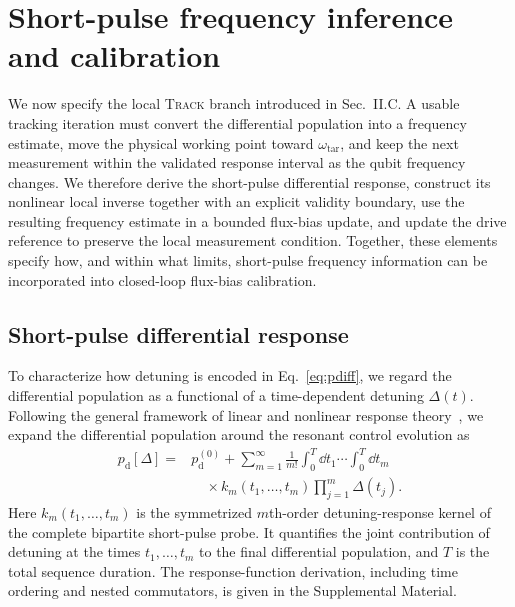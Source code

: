﻿\section{Short-pulse frequency inference and calibration}
\label{sec:inference-calibration}

We now specify the local \textsc{Track} branch introduced in Sec.~II.C.
A usable tracking iteration must convert the differential population into a
frequency estimate, move the physical working point toward
$\omega_{\mathrm{tar}}$, and keep the next measurement within the validated
response interval as the qubit frequency changes. We therefore derive the
short-pulse differential response, construct its nonlinear local inverse
together with an explicit validity boundary, use the resulting frequency
estimate in a bounded flux-bias update, and update the drive reference to
preserve the local measurement condition. Together, these elements specify how, and within what limits, short-pulse
frequency information can be incorporated into closed-loop flux-bias
calibration.


\subsection{Short-pulse differential response}
\label{sec:differential-response}

To characterize how detuning is encoded in
Eq.~\eqref{eq:pdiff}, we regard the differential population as a
functional of a time-dependent detuning $\Delta(t)$. Following the general
framework of linear and nonlinear response
theory~\cite{kubo1957statistical,mukamel1995principles}, we expand the
differential population around the resonant control evolution as
%
\begin{equation}
\begin{aligned}
p_{\mathrm d}[\Delta]
={}&
p_{\mathrm d}^{(0)}
+
\sum_{m=1}^{\infty}
\frac{1}{m!}
\int_0^T\!\dd t_1\cdots\int_0^T\!\dd t_m
\\
&\quad\times
k_m(t_1,\ldots,t_m)
\prod_{j=1}^{m}\Delta(t_j).
\end{aligned}
\label{eq:differential-volterra}
\end{equation}
%
Here $k_m(t_1,\ldots,t_m)$ is the symmetrized $m$th-order
detuning-response kernel of the complete bipartite short-pulse probe. It
quantifies the joint contribution of detuning at the times
$t_1,\ldots,t_m$ to the final differential population, and $T$ is the total
sequence duration. The response-function derivation, including time ordering
and nested commutators, is given in the Supplemental Material.

